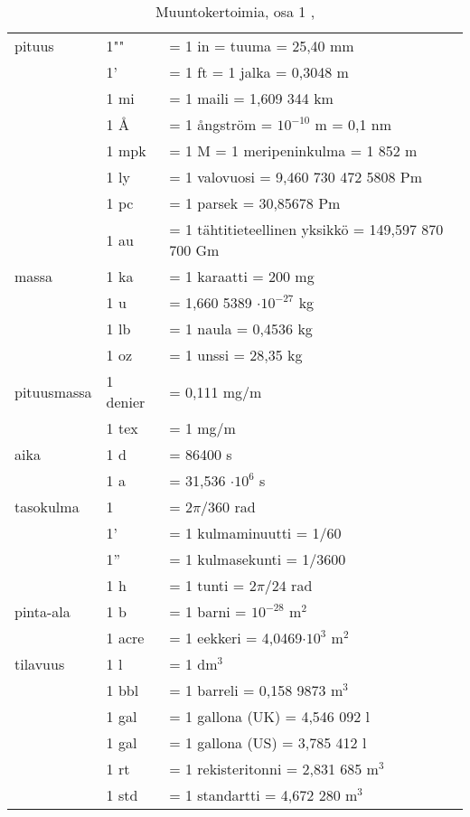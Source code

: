 \begin{table}[ht!]
\centering
\setlength{\extrarowheight}{2pt}
\caption{Muuntokertoimia, osa 1 \cite{MAOL}, \cite{IAU-Measuring} }
\begin{tabu} to \textwidth {l|lX}
\hline
pituus	& 1""	& = 1 in = tuuma = 25,40 mm \\
		& 1'	& = 1 ft = 1 jalka = 0,3048 m \\
		& 1 mi	& = 1 maili = 1,609 344 km \\
		& 1 Å	& = 1 ångström = $10^{-10}$ m = 0,1 nm \\
		& 1 mpk	& = 1 M = 1 meripeninkulma = 1 852 m \\
		& 1 ly	& = 1 valovuosi = 9,460 730 472 5808 Pm\\ %
		& 1 pc	& = 1 parsek = 30,85678 Pm \\
		& 1 au	& = 1 tähtitieteellinen yksikkö = 149,597 870 700 Gm \\ %
\hline
massa	& 1 ka	& = 1 karaatti = 200 mg \\
		& 1 u	& = 1,660 5389 $\cdot 10^{-27}$ kg \\
		& 1 lb	& = 1 naula = 0,4536 kg \\
		& 1 oz	& = 1 unssi = 28,35 kg \\
\hline
pituusmassa	& 1 denier	& = 0,111 mg/m \\
			& 1 tex		& = 1 mg/m \\
\hline
aika	& 1 d	& = 86400 s \\
		& 1 a	& = 31,536 $\cdot 10^6$ s \\
\hline
tasokulma	& 1\degree	& = $2 \pi /360$ rad \\
			& 1'		& = 1 kulmaminuutti = 1/60\degree \\
			& 1''		& = 1 kulmasekunti = 1/3600\degree \\
			& 1 h		& = 1 tunti = $2 \pi / 24$ rad \\
\hline
pinta-ala	& 1 b		& = 1 barni = $10^{-28}$ m$^2$ \\
			& 1 acre	& = 1 eekkeri = 4,0469$\cdot 10^3$ m$^2$ \\
\hline
tilavuus	& 1 l		& = 1 dm$^3$ \\
			& 1 bbl		& = 1 barreli = 0,158 9873 m$^3$ \\
			& 1 gal		& = 1 gallona (UK) = 4,546 092 l \\
			& 1 gal		& = 1 gallona (US) = 3,785 412 l \\
			& 1 rt		& = 1 rekisteritonni = 2,831 685 m$^3$ \\
			& 1 std		& = 1 standartti = 4,672 280 m$^3$ \\
\end{tabu}
\end{table}


